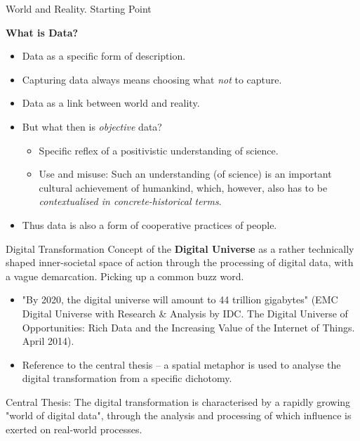 \documentclass{beamer}
\newcommand{\ueberschrift}[1]{\begin{center}\bf #1\end{center}}
\begin{document}
\begin{frame}{World and Reality. Starting Point}
  \ueberschrift{What is Data?}
  \begin{itemize}
  \item Data as a specific form of description.
  \item Capturing data always means choosing what \emph{not} to capture.
  \item Data as a link between world and reality.
  \item But what then is \emph{objective} data?
    \begin{itemize}
    \item Specific reflex of a positivistic understanding of science.
    \item Use and misuse: Such an understanding (of science) is an important
      cultural achievement of humankind, which, however, also has to be
      \emph{contextualised in concrete-historical terms}.
    \end{itemize}
  \item Thus data is also a form of cooperative practices of people.
  \end{itemize}
\end{frame}
\begin{frame}{Digital Transformation}
  Concept of the \textbf{Digital Universe} as a rather technically shaped
  inner-societal space of action through the processing of digital data, with
  a vague demarcation.  Picking up a common buzz word.
\begin{itemize}
\item "By 2020, the digital universe will amount to 44 trillion gigabytes"
  (EMC Digital Universe with Research \& Analysis by IDC. The Digital Universe
  of Opportunities: Rich Data and the Increasing Value of the Internet of
  Things. April 2014).
\item Reference to the central thesis -- a spatial metaphor is used to analyse
  the digital transformation from a specific dichotomy.
\end{itemize}
\begin{block}{Central Thesis:}
  The digital transformation is characterised by a rapidly growing "world of
  digital data", through the analysis and processing of which influence is
  exerted on real-world processes.
\end{block}
\end{frame}
\end{document}
